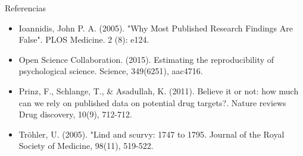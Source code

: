 ﻿\documentclass{beamer}
\begin{document}
\begin{frame}{Referencias}

   \begin{itemize}
        \item Ioannidis, John P. A. (2005). "Why Most Published Research Findings Are False". PLOS Medicine. 2 (8): e124.
        \item Open Science Collaboration. (2015). Estimating the reproducibility of psychological science. Science, 349(6251), aac4716.
        \item Prinz, F., Schlange, T., \& Asadullah, K. (2011). Believe it or not: how much can we rely on published data on potential drug targets?. Nature reviews Drug discovery, 10(9), 712-712.
        \item Tröhler, U. (2005). "Lind and scurvy: 1747 to 1795. Journal of the Royal Society of Medicine, 98(11), 519-522.  
   \end{itemize}
   
\end{frame}
   
\end{document}
